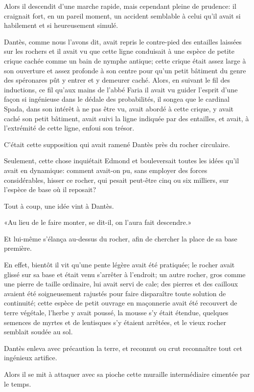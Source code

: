 Alors il descendit d'une marche rapide, mais cependant pleine de prudence: il craignait fort, en un pareil moment, un accident semblable à celui qu'il avait si habilement et si heureusement simulé.

Dantès, comme nous l'avons dit, avait repris le contre-pied des entailles laissées sur les rochers et il avait vu que cette ligne conduisait à une espèce de petite crique cachée comme un bain de nymphe antique; cette crique était assez large à son ouverture et assez profonde à son centre pour qu'un petit bâtiment du genre des spéronares pût y entrer et y demeurer caché. Alors, en suivant le fil des inductions, ce fil qu'aux mains de l'abbé Faria il avait vu guider l'esprit d'une façon si ingénieuse dans le dédale des probabilités, il songea que le cardinal Spada, dans son intérêt à ne pas être vu, avait abordé à cette crique, y avait caché son petit bâtiment, avait suivi la ligne indiquée par des entailles, et avait, à l'extrémité de cette ligne, enfoui son trésor.

C'était cette supposition qui avait ramené Dantès près du rocher circulaire.

Seulement, cette chose inquiétait Edmond et bouleversait toutes les idées qu'il avait en dynamique: comment avait-on pu, sans employer des forces considérables, hisser ce rocher, qui pesait peut-être cinq ou six milliers, sur l'espèce de base où il reposait?

Tout à coup, une idée vint à Dantès.

«Au lieu de le faire monter, se dit-il, on l'aura fait descendre.»

Et lui-même s'élança au-dessus du rocher, afin de chercher la place de sa base première.

En effet, bientôt il vit qu'une pente légère avait été pratiquée; le rocher avait glissé sur sa base et était venu s'arrêter à l'endroit; un autre rocher, gros comme une pierre de taille ordinaire, lui avait servi de cale; des pierres et des cailloux avaient été soigneusement rajustés pour faire disparaître toute solution de continuité; cette espèce de petit ouvrage en maçonnerie avait été recouvert de terre végétale, l'herbe y avait poussé, la mousse s'y était étendue, quelques semences de myrtes et de lentisques s'y étaient arrêtées, et le vieux rocher semblait soudée au sol.

Dantès enleva avec précaution la terre, et reconnut ou crut reconnaître tout cet ingénieux artifice.

Alors il se mit à attaquer avec sa pioche cette muraille intermédiaire cimentée par le temps.


